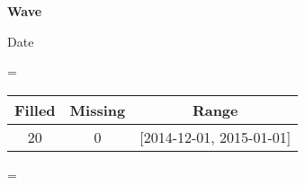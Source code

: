 \documentclass{article}
\newenvironment{absolutelynopagebreak}
  {\par\nobreak\vfil\penalty0\vfilneg
   \vtop\bgroup}
  {\par\xdef\tpd{\the\prevdepth}\egroup
   \prevdepth=\tpd}
\begin{document}
\begin{absolutelynopagebreak}
\begin{absolutelynopagebreak}

\vskip 0.25in
\textbf{Wave}\hfill\textbf{}

{\small Date}

\vskip 0.10in

\vskip 0.10in\end{absolutelynopagebreak} 
\begin{longtable}[l]{ccc}
\toprule
Filled & Missing & Range\\
\midrule
20 & 0 & [2014-12-01, 2015-01-01]\\
\bottomrule
\end{longtable}\end{absolutelynopagebreak}

\clearpage
\end{document}
